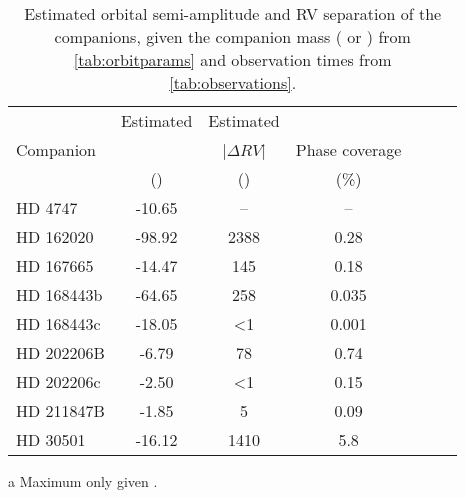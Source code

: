\begin{table*}
    \centering
    \begin{threeparttable}[b]
        \caption[Semi-amplitude and RV separation of companions.]{Estimated orbital semi-amplitude and {RV} separation of the companions, given the companion mass (\Mtwo{} or \Mtwosini{}) from \cref{tab:orbitparams} and observation times from \cref{tab:observations}.}
        \begin{tabular}{l c c c c c c}%
            \toprule
             & Estimated & Estimated & & \\  %
             Companion & \Ktwo{} & |\(\Delta {RV}\)| & Phase coverage\\
             & (\kmps{}) & (\mps{}) & (\%)\\
             \midrule
             {HD 4747} & -10.65 & -- & --\\  %
             {HD 162020} & -98.92\tnote{a} & 2388 & 0.28\\  %
             {HD 167665} & -14.47\tnote{a} & 145 & 0.18\\  %
             {HD 168443b} & -64.65\tnote{a} & 258 & 0.035\\
             {HD 168443c} & -18.05\tnote{a} & <1 & 0.001\\  %
             {HD 202206}B & -6.79 & 78 & 0.74\\  %
             {HD 202206}c & -2.50 & <1 & 0.15\\  %
             {HD 211847}B & -1.85 & 5 & 0.09\\  %
             {HD 30501} & -16.12 & 1410 & 5.8\\
             \bottomrule
         \end{tabular}\label{tab:estimated_rv}
         \begin{tablenotes}
            \item[a] {Maximum \Ktwo{} only given \Mtwosini.}
         \end{tablenotes}
    \end{threeparttable}
\end{table*}
